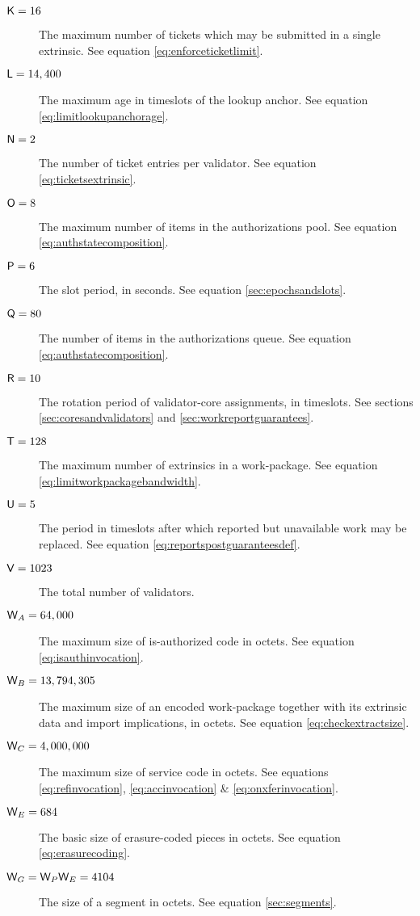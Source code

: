 \begin{description}
  \item[$\mathsf{K} = 16$] The maximum number of tickets which may be submitted in a single extrinsic. See equation \ref{eq:enforceticketlimit}.
  \item[$\mathsf{L} = 14,400$] The maximum age in timeslots of the lookup anchor. See equation \ref{eq:limitlookupanchorage}.
  \item[$\mathsf{N} = 2$] The number of ticket entries per validator. See equation \ref{eq:ticketsextrinsic}.
  \item[$\mathsf{O} = 8$] The maximum number of items in the authorizations pool. See equation \ref{eq:authstatecomposition}.
  \item[$\mathsf{P} = 6$] The slot period, in seconds. See equation \ref{sec:epochsandslots}.
  \item[$\mathsf{Q} = 80$] The number of items in the authorizations queue. See equation \ref{eq:authstatecomposition}.
  \item[$\mathsf{R} = 10$] The rotation period of validator-core assignments, in timeslots. See sections \ref{sec:coresandvalidators} and \ref{sec:workreportguarantees}.
  \item[$\mathsf{T} = 128$] The maximum number of extrinsics in a work-package. See equation \ref{eq:limitworkpackagebandwidth}.
  \item[$\mathsf{U} = 5$] The period in timeslots after which reported but unavailable work may be replaced. See equation \ref{eq:reportspostguaranteesdef}.
  \item[$\mathsf{V} = 1023$] The total number of validators.
  \item[$\mathsf{W}_A = 64,000$] The maximum size of is-authorized code in octets. See equation \ref{eq:isauthinvocation}.
  \item[$\mathsf{W}_B = 13,794,305$] The maximum size of an encoded work-package together with its extrinsic data and import implications, in octets. See equation \ref{eq:checkextractsize}.
  \item[$\mathsf{W}_C = 4,000,000$] The maximum size of service code in octets. See equations \ref{eq:refinvocation}, \ref{eq:accinvocation} \& \ref{eq:onxferinvocation}.
  \item[$\mathsf{W}_E = 684$] The basic size of erasure-coded pieces in octets. See equation \ref{eq:erasurecoding}.
  \item[$\mathsf{W}_G = \mathsf{W}_P\mathsf{W}_E = 4104$] The size of a segment in octets. See equation \ref{sec:segments}.

\end{description}
